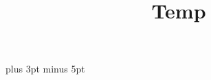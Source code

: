 \documentclass[a5paper,twoside]{article}
\title{Temp}
\begin{document}

  \versesep=12pt plus 3pt minus 5pt

  \begin{songs}{}
    

  \end{songs}
\end{document}
